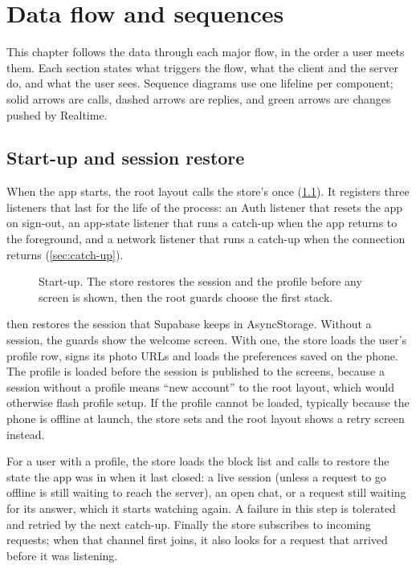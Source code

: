 \chapter{Data flow and sequences}
\label{ch:flows}

This chapter follows the data through each major flow, in the order a user meets them. Each section
states what triggers the flow, what the client and the server do, and what the user sees. Sequence
diagrams use one lifeline per component; solid arrows are calls, dashed arrows are replies, and green
arrows are changes pushed by Realtime.

\section{Start-up and session restore}
\label{sec:flow-boot}

When the app starts, the root layout calls the store's  once (\cref{fig:boot}). It registers
three listeners that last for the life of the process: an Auth listener that resets the app on sign-out,
an app-state listener that runs a catch-up when the app returns to the foreground, and a network listener
that runs a catch-up when the connection returns (\cref{sec:catch-up}).

\begin{figure}[ht]
  \centering
  
  \caption{Start-up. The store restores the session and the profile before any screen is shown, then the
    root guards choose the first stack.}
  \label{fig:boot}
\end{figure}

 then restores the session that Supabase keeps in AsyncStorage. Without a session, the
guards show the welcome screen. With one, the store loads the user's profile row, signs its photo URLs
and loads the preferences saved on the phone. The profile is loaded before the session is published to
the screens, because a session without a profile means ``new account'' to the root layout, which would
otherwise flash profile setup. If the profile cannot be loaded, typically because the phone is offline at
launch, the store sets  and the root layout shows a retry screen instead.

For a user with a profile, the store loads the block list and calls  to restore the
state the app was in when it last closed: a live session (unless a request to go offline is still
waiting to reach the server), an open chat, or a request still waiting for its answer, which it starts
watching again. A failure in this step is tolerated and retried by the next catch-up. Finally the store
subscribes to incoming requests; when that channel first joins, it also looks for a request that arrived
before it was listening.

